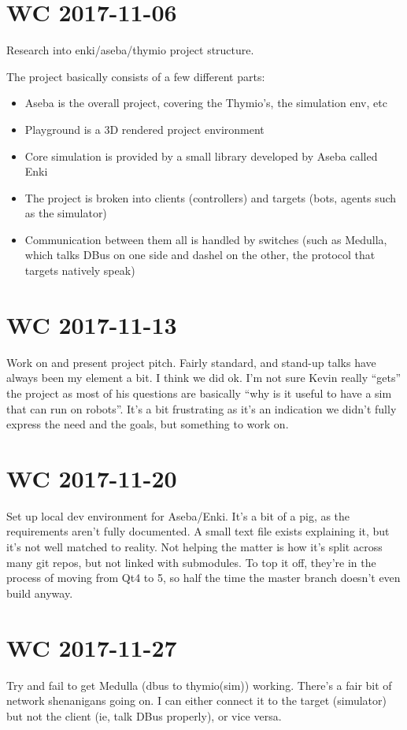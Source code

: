 \documentclass[a4paper]{article}
\begin{document}
\section{WC 2017-11-06}
    Research into enki/aseba/thymio project structure.

    The project basically consists of a few different parts:
    \begin{itemize}
        \item Aseba is the overall project, covering the Thymio's, the simulation env, etc
        \item Playground is a 3D rendered project environment
        \item Core simulation is provided by a small library developed by Aseba called Enki
        \item The project is broken into clients (controllers) and targets (bots, agents such as the simulator)
        \item Communication between them all is handled by switches (such as Medulla, which talks DBus on one side and
            dashel on the other, the protocol that targets natively speak)
    \end{itemize}
\section{WC 2017-11-13}
    Work on and present project pitch. Fairly standard, and stand-up talks have always been my element a bit. I think we
    did ok. I'm not sure Kevin really ``gets'' the project as most of his questions are basically ``why is it useful to
    have a sim that can run on robots''. It's a bit frustrating as it's an indication we didn't fully express the need
    and the goals, but something to work on.
\section{WC 2017-11-20}
    Set up local dev environment for Aseba/Enki. It's a bit of a pig, as the requirements aren't fully documented. A
    small text file exists explaining it, but it's not well matched to reality. Not helping the matter is how it's split
    across many git repos, but not linked with submodules. To top it off, they're in the process of moving from Qt4 to
    5, so half the time the master branch doesn't even build anyway.
\section{WC 2017-11-27}
    Try and fail to get Medulla (dbus to thymio(sim)) working. There's a fair bit of network shenanigans going on. I can
    either connect it to the target (simulator) but not the client (ie, talk DBus properly), or vice versa.
\end{document}
